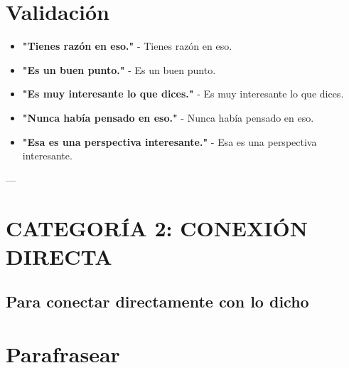 \documentclass[a4paper,11pt]{article}
\begin{document}
\vspace{0.2cm}

\section{Validación}

\begin{itemize}

  \item \textbf{"Tienes razón en eso."} - Tienes razón en eso.

  \item \textbf{"Es un buen punto."} - Es un buen punto.

  \item \textbf{"Es muy interesante lo que dices."} - Es muy interesante lo que dices.

  \item \textbf{"Nunca había pensado en eso."} - Nunca había pensado en eso.

  \item \textbf{"Esa es una perspectiva interesante."} - Esa es una perspectiva interesante.

\end{itemize}

\vspace{0.2cm}

---

\vspace{0.2cm}

\section{CATEGORÍA 2: CONEXIÓN DIRECTA}

\vspace{0.2cm}

\subsection{Para conectar directamente con lo dicho}

\vspace{0.2cm}

\section{Parafrasear}
\end{document}
